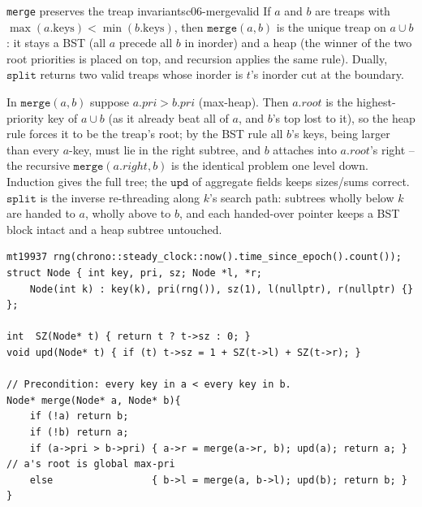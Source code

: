 \begin{lemma}{\texttt{merge} preserves the treap invariants}{c06-mergevalid}
If $a$ and $b$ are treaps with $\max(a.\text{keys}) < \min(b.\text{keys})$, then $\texttt{merge}(a,b)$ is
the unique treap on $a\cup b$: it stays a BST (all $a$ precede all $b$ in inorder) and a heap (the winner
of the two root priorities is placed on top, and recursion applies the same rule). Dually,
$\texttt{split}$ returns two valid treaps whose inorder is $t$'s inorder cut at the boundary.
\end{lemma}
\begin{proofbox}
In $\texttt{merge}(a,b)$ suppose $a.\mathit{pri} > b.\mathit{pri}$ (max-heap). Then $a.\mathit{root}$ is the
highest-priority key of $a\cup b$ (as it already beat all of $a$, and $b$'s top lost to it), so the heap
rule forces it to be the treap's root; by the BST rule all $b$'s keys, being larger than every $a$-key,
must lie in the right subtree, and $b$ attaches into $a.\mathit{root}$'s right -- the recursive
$\texttt{merge}(a.\mathit{right}, b)$ is the identical problem one level down. Induction gives the full
tree; the $\texttt{upd}$ of aggregate fields keeps sizes/sums correct. $\texttt{split}$ is the inverse
re-threading along $k$'s search path: subtrees wholly below $k$ are handed to $a$, wholly above to $b$, and
each handed-over pointer keeps a BST block intact and a heap subtree untouched. \end{proofbox}

\begin{lstlisting}[caption={Treap node, aggregate update, and merge -- the two rules maintained by recursion, no rotations}, label={lst:c06-treap}]
mt19937 rng(chrono::steady_clock::now().time_since_epoch().count());
struct Node { int key, pri, sz; Node *l, *r;
    Node(int k) : key(k), pri(rng()), sz(1), l(nullptr), r(nullptr) {} };

int  SZ(Node* t) { return t ? t->sz : 0; }
void upd(Node* t) { if (t) t->sz = 1 + SZ(t->l) + SZ(t->r); }

// Precondition: every key in a < every key in b.
Node* merge(Node* a, Node* b){
    if (!a) return b;
    if (!b) return a;
    if (a->pri > b->pri) { a->r = merge(a->r, b); upd(a); return a; } // a's root is global max-pri
    else                 { b->l = merge(a, b->l); upd(b); return b; }
}
\end{lstlisting}

